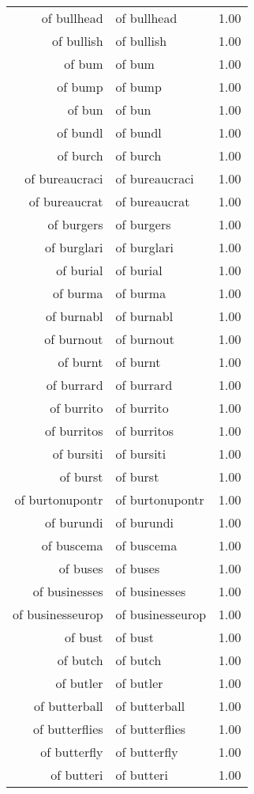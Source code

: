 \begin{table}[ht]
\begin{tabular}{rlr}
  of bullhead & of bullhead & 1.00 \\ 
  of bullish & of bullish & 1.00 \\ 
  of bum & of bum & 1.00 \\ 
  of bump & of bump & 1.00 \\ 
  of bun & of bun & 1.00 \\ 
  of bundl & of bundl & 1.00 \\ 
  of burch & of burch & 1.00 \\ 
  of bureaucraci & of bureaucraci & 1.00 \\ 
  of bureaucrat & of bureaucrat & 1.00 \\ 
  of burgers & of burgers & 1.00 \\ 
  of burglari & of burglari & 1.00 \\ 
  of burial & of burial & 1.00 \\ 
  of burma & of burma & 1.00 \\ 
  of burnabl & of burnabl & 1.00 \\ 
  of burnout & of burnout & 1.00 \\ 
  of burnt & of burnt & 1.00 \\ 
  of burrard & of burrard & 1.00 \\ 
  of burrito & of burrito & 1.00 \\ 
  of burritos & of burritos & 1.00 \\ 
  of bursiti & of bursiti & 1.00 \\ 
  of burst & of burst & 1.00 \\ 
  of burtonupontr & of burtonupontr & 1.00 \\ 
  of burundi & of burundi & 1.00 \\ 
  of buscema & of buscema & 1.00 \\ 
  of buses & of buses & 1.00 \\ 
  of businesses & of businesses & 1.00 \\ 
  of businesseurop & of businesseurop & 1.00 \\ 
  of bust & of bust & 1.00 \\ 
  of butch & of butch & 1.00 \\ 
  of butler & of butler & 1.00 \\ 
  of butterball & of butterball & 1.00 \\ 
  of butterflies & of butterflies & 1.00 \\ 
  of butterfly & of butterfly & 1.00 \\ 
  of butteri & of butteri & 1.00 \\ 

\end{tabular}
\end{table}
